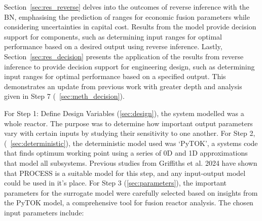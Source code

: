 \documentclass[journal]{IEEEtran}
\begin{document}
Section~\ref{sec:res_reverse} delves into the outcomes of reverse inference with the BN, emphasising the prediction of ranges for economic fusion parameters while considering uncertainties in capital cost. Results from the model provide decision support for components, such as determining input ranges for optimal performance based on a desired output using reverse inference. Lastly, Section~\ref{sec:res_decision} presents the application of the results from reverse inference to provide decision support for engineering design, such as determining input ranges for optimal performance based on a specified output. This demonstrates an update from previous work with greater depth and analysis given in Step 7 (~\ref{sec:meth_decision}).

For Step 1: Define Design Variables (\ref{sec:design}), the system modelled was a whole reactor. The purpose was to determine how important output parameters vary with certain inputs by studying their sensitivity to one another. For Step 2, (~\ref{sec:deterministic}), the deterministic  model used was `PyTOK', a systems code that finds optimum working point using a series of 0D and 1D approximations that model all subsystems. Previous studies from Griffiths et al. 2024 have shown that PROCESS is a suitable model for this step, and any input-output model could be used in it's place. For Step 3 (\ref{sec:parameters}), the important parameters for the surrogate model were carefully selected based on insights from the PyTOK model, a comprehensive tool for fusion reactor analysis. The chosen input parameters include:
\end{document}
